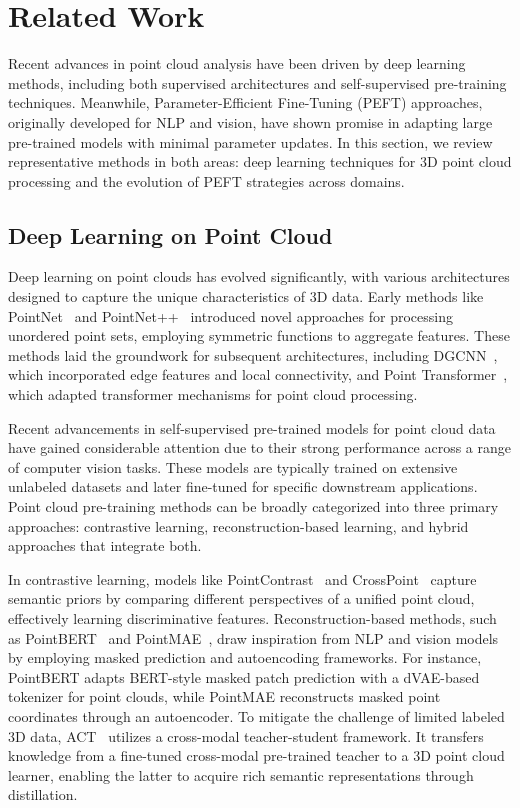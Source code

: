 \section{Related Work}
\label{sec:relatedwork}

Recent advances in point cloud analysis have been driven by deep learning methods, including both supervised architectures and self-supervised pre-training techniques. Meanwhile, Parameter-Efficient Fine-Tuning (PEFT) approaches, originally developed for NLP and vision, have shown promise in adapting large pre-trained models with minimal parameter updates. In this section, we review representative methods in both areas: deep learning techniques for 3D point cloud processing and the evolution of PEFT strategies across domains.

\subsection{Deep Learning on Point Cloud}

Deep learning on point clouds has evolved significantly, with various architectures designed to capture the unique characteristics of 3D data. Early methods like PointNet~\cite{qi2017pointnet} and PointNet++~\cite{qi2017pointnet++} introduced novel approaches for processing unordered point sets, employing symmetric functions to aggregate features. These methods laid the groundwork for subsequent architectures, including DGCNN~\cite{wang2019dynamic}, which incorporated edge features and local connectivity, and Point Transformer~\cite{zhao2021point}, which adapted transformer mechanisms for point cloud processing.

Recent advancements in self-supervised pre-trained models for point cloud data have gained considerable attention due to their strong performance across a range of computer vision tasks. These models are typically trained on extensive unlabeled datasets and later fine-tuned for specific downstream applications. Point cloud pre-training methods can be broadly categorized into three primary approaches: contrastive learning, reconstruction-based learning, and hybrid approaches that integrate both.

In contrastive learning, models like PointContrast~\cite{xie2020pointcontrast} and CrossPoint~\cite{afham2022crosspoint} capture semantic priors by comparing different perspectives of a unified point cloud, effectively learning discriminative features. Reconstruction-based methods, such as PointBERT~\cite{yu2022point} and PointMAE~\cite{pang2022masked}, draw inspiration from NLP and vision models by employing masked prediction and autoencoding frameworks. For instance, PointBERT adapts BERT-style masked patch prediction with a dVAE-based tokenizer for point clouds, while PointMAE reconstructs masked point coordinates through an autoencoder. To mitigate the challenge of limited labeled 3D data, ACT~\cite{dong2022autoencoders} utilizes a cross-modal teacher-student framework. It transfers knowledge from a fine-tuned cross-modal pre-trained teacher to a 3D point cloud learner, enabling the latter to acquire rich semantic representations through distillation.

